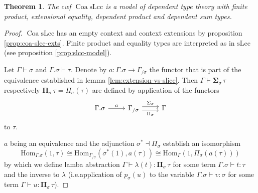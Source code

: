 \documentclass[a4paper]{article}
\newtheorem{theorem}{Theorem}
\theoremstyle{remark}
\theoremstyle{definition}
\begin{document}
\begin{theorem}
  \label{th:lcc-supports-types}
  The cwf $\operatorname{Coa} \mathrm{sLcc}$ is a model of dependent type theory with finite product, extensional equality, dependent product and dependent sum types.
\end{theorem}
\begin{proof}
  $\operatorname{Coa} \mathrm{sLcc}$ has an empty context and context extensions by proposition \ref{prop:coa-slcc-exts}.
  Finite product and equality types are interpreted as in $\mathrm{sLcc}$ (see proposition \ref{prop:slcc-model}).

  Let $\Gamma \vdash \sigma$ and $\Gamma.\sigma \vdash \tau$.
  Denote by $a : \Gamma.\sigma \rightarrow \Gamma_{/ \sigma}$ the functor that is part of the equivalence established in lemma \ref{lem:extension-vs-slice}.
  Then $\Gamma \vdash \mathbf{\Sigma}_\sigma \, \tau$ respectively $\mathbf{\Pi}_\sigma \, \tau = \Pi_\sigma(\tau)$ are defined by application of the functors
  \begin{equation}
    \begin{tikzcd}
      \Gamma.\sigma \arrow[r, "a"] & \Gamma_{/ \sigma} \arrow[r, shift left, "\Sigma_\sigma"] \arrow[r, shift right, "\Pi_\sigma"'] & \Gamma
    \end{tikzcd}
  \end{equation}
  to $\tau$.

  $a$ being an equivalence and the adjunction $\sigma^* \dashv \Pi_\sigma$ establish an isomorphism
  \begin{equation}
    \mathrm{Hom}_{\Gamma.\sigma}(1, \tau) \cong \mathrm{Hom}_{\Gamma_{/ \sigma}}(\sigma^*(1), a(\tau)) \cong \mathrm{Hom}_{\Gamma}(1, \Pi_\sigma(a(\tau)))
  \end{equation}
  by which we define lamba abstraction $\Gamma \vdash \lambda(t) : \mathbf{\Pi}_\sigma \, \tau$ for some term $\Gamma.\sigma \vdash t : \tau$ and the inverse to $\lambda$ (i.e.\@ application of $p_\sigma(u)$ to the variable $\Gamma.\sigma \vdash v : \sigma$ for some term $\Gamma \vdash u : \mathbf{\Pi}_\sigma \, \tau$).


\end{proof}
\end{document}
